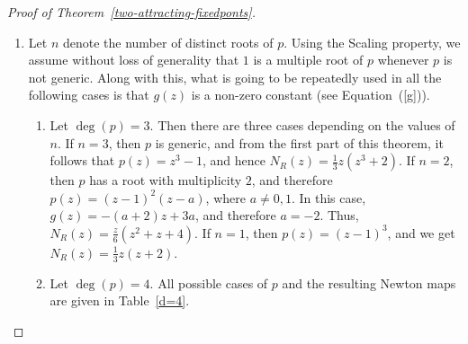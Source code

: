 \documentclass[12pt]{article}
\numberwithin{equation}{section}
\begin{document}
\begin{proof}[Proof of Theorem~\ref{two-attracting-fixedponts}]
\begin{enumerate}
 \item Let $n$ denote the number of distinct roots of $p$. Using the Scaling property, we assume without loss of generality that $1$ is a multiple root of $p$ whenever $p$ is not generic. Along with this, what is going to be repeatedly used in all the following cases is that $g(z) $ is a non-zero constant (see Equation~(\ref{g})).
{\begin{enumerate}
		\item Let $\deg(p)=3$. Then there are three cases depending on the values of $n$. If $n=3$, then $p$ is generic, and from the first part of this theorem, it follows that $p(z)=z^3-1$, and hence $N_R(z)=\frac{1}{3}z(z^3+2)$. If $n=2$, then  $p$ has a root with multiplicity $2$, and therefore  $p(z)=(z-1)^2(z-a)$, where $a\neq 0,1$. In this case, $g(z) =-(a+2)z+3a$, and therefore  $a=-2$. Thus,   $N_R(z)= \frac{z}{6}(z^2+z+4)$. If $n=1$, then  $p(z)=(z-1)^3$, and we get  $N_R(z)=\frac{1}{3}z(z+2)$. 
		\item Let $\deg(p)=4$. All possible cases of $p$ and the resulting Newton maps are given in Table~\ref{d=4}.
		

\end{enumerate}}
\end{enumerate}
\end{proof}
\end{document}
